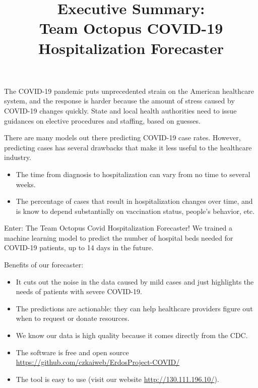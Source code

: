\documentclass{article}
\begin{document}
\title{Executive Summary:\\Team Octopus COVID-19 Hospitalization Forecaster}
\date{}
\maketitle
\thispagestyle{empty}
The COVID-19 pandemic puts unprecedented strain on the American healthcare system, and the response is harder because the amount of stress caused by COVID-19 changes quickly. State and local health authorities need to issue guidances on elective procedures and staffing, based on guesses.
\bigskip

\noindent There are many models out there predicting COVID-19 case rates. However, predicting cases has several drawbacks that make it less useful to the healthcare industry.
\begin{itemize}
\item The time from diagnosis to hospitalization can vary from no time to several weeks.
\item The percentage of cases that result in hospitalization changes over time, and is know to depend substantially on vaccination status, people's behavior, etc.
\end{itemize}
\bigskip

Enter: The Team Octopus Covid Hospitalization Forecaster! We trained a machine learning model to predict the number of hospital beds needed for COVID-19 patients, up to 14 days in the future.
\smallskip

\noindent Benefits of our forecaster:
\begin{itemize}
\item It cuts out the noise in the data caused by mild cases and just highlights the needs of patients with severe COVID-19.
\item The predictions are actionable: they can help healthcare providers figure out when to request or donate resources.
\item We know our data is high quality because it comes directly from the CDC.
\item The software is free and open source\\
\url{https://github.com/czkaiweb/ErdosProject-COVID/}
\item The tool is easy to use (visit our website \url{http://130.111.196.10/}).
\end{itemize}


%
%
\end{document}
